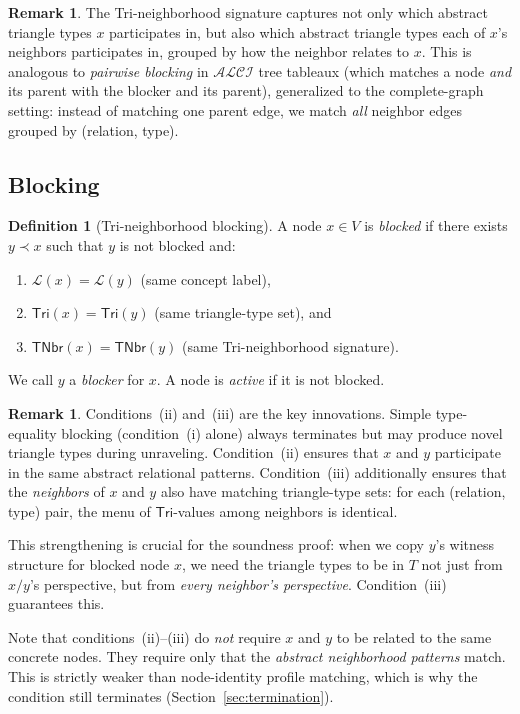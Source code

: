 \documentclass[a4paper,11pt]{article}
\theoremstyle{definition}
\newtheorem{definition}[theorem]{Definition}
\newtheorem{remark}[theorem]{Remark}
\newcommand{\ALCI}{\ensuremath{\mathcal{ALCI}}}
\newcommand{\Tri}{\ensuremath{\mathsf{Tri}}}
\newcommand{\TNbr}{\ensuremath{\mathsf{TNbr}}}
\newcommand{\LL}{\ensuremath{\mathcal{L}}}
\begin{document}
\begin{remark}
The Tri-neighborhood signature captures not only which
abstract triangle types $x$ participates in, but also which
abstract triangle types each of $x$'s neighbors participates
in, grouped by how the neighbor relates to $x$.  This is
analogous to \emph{pairwise blocking} in $\ALCI$ tree tableaux
(which matches a node \emph{and} its parent with the blocker
and its parent), generalized to the complete-graph setting:
instead of matching one parent edge, we match \emph{all}
neighbor edges grouped by (relation, type).
\end{remark}

\subsection{Blocking}\label{sec:blocking}

\begin{definition}[Tri-neighborhood blocking]\label{def:blocking}
A node $x \in V$ is \emph{blocked} if there exists $y \prec x$
such that $y$ is not blocked and:
\begin{enumerate}[nosep,label=(\roman*)]
  \item $\LL(x) = \LL(y)$ (same concept label),
  \item $\Tri(x) = \Tri(y)$ (same triangle-type set), and
  \item $\TNbr(x) = \TNbr(y)$ (same Tri-neighborhood signature).
\end{enumerate}
We call $y$ a \emph{blocker} for $x$.  A node is \emph{active}
if it is not blocked.
\end{definition}

\begin{remark}
Conditions~(ii) and~(iii) are the key innovations.  Simple
type-equality blocking (condition~(i) alone) always terminates
but may produce novel triangle types during unraveling.
Condition~(ii) ensures that $x$ and $y$ participate in the
same abstract relational patterns.  Condition~(iii) additionally
ensures that the \emph{neighbors} of $x$ and $y$ also have
matching triangle-type sets: for each (relation, type) pair,
the menu of $\Tri$-values among neighbors is identical.

This strengthening is crucial for the soundness proof: when
we copy $y$'s witness structure for blocked node $x$, we need
the triangle types to be in $T$ not just from $x/y$'s
perspective, but from \emph{every neighbor's perspective}.
Condition~(iii) guarantees this.

Note that conditions~(ii)--(iii) do \emph{not} require $x$ and
$y$ to be related to the same concrete nodes.  They require only
that the \emph{abstract neighborhood patterns} match.  This is
strictly weaker than node-identity profile matching, which is why
the condition still terminates (Section~\ref{sec:termination}).
\end{remark}
\end{document}
